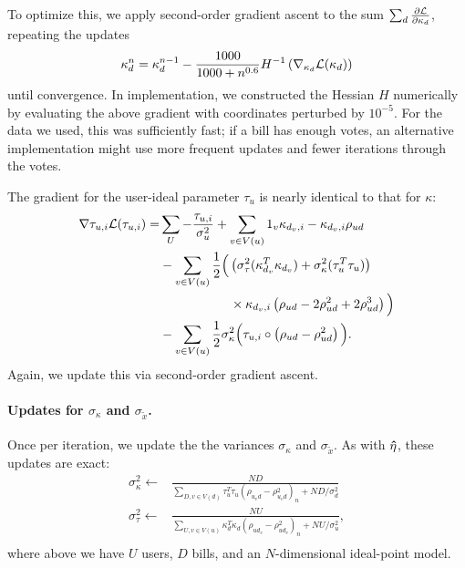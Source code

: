 To optimize this, we apply second-order gradient ascent to the sum
$\sum_d \frac{\partial \mathcal{L}}{\partial \kappa_d}$, repeating the updates 
\[\kappa_{d}^{n} = \kappa_{d}^{n-1} - \frac{1000}{1000 + n^{0.6}} H^{-1}\left( \nabla_{\kappa_{d}} \mathcal{L} (\kappa_{d}) \right) \]
until convergence.  In implementation, we constructed the Hessian $H$
numerically by evaluating the above gradient with coordinates
perturbed by $10^{-5}$.  For the data we used, this was sufficiently
fast; if a bill has enough votes, an alternative implementation
might use more frequent updates and fewer iterations through the
votes.

The gradient for the user-ideal parameter $\tau_u$ is nearly identical
to that for $\kappa$: 
 \begin{align}
 \label{eq:tau_update}
   \nabla{\tau_{u, i}} \mathcal{L} (\tau_{u, i}) =
 & \sum_{U} - \frac{\tau_{u, i}}{\sigma^2_u} 
  +  \sum_{v \in V(u)} 1_v \kappa_{d_v, i} - \kappa_{d_v, i} \rho_{ud} \nonumber \\
  & - \sum_{v \in V(u)} \frac{1}{2}
      \Big( \left( \sigma_\tau^2 (\kappa_{d_v}^T \kappa_{d_v}) + \sigma_\kappa^2 (\tau_u^T \tau_u) \right) \nonumber \\
  & \hspace{55pt} \times \kappa_{d_v, i} \left( \rho_{ud} - 2 \rho_{ud}^2 + 2 \rho_{ud}^3 \right) \Big) \nonumber \\
   & - \sum_{v \in V(u)} \frac{1}{2} \sigma_\kappa^2 \Big( \tau_{u,i} \circ
      \left( \rho_{ud}
      - \rho_{ud}^2 \right) \Big). \nonumber
 \end{align}
Again, we update this via second-order gradient ascent.

\paragraph{Updates for $\sigma_\kappa$ and $\sigma_{\tilde x}$.}
Once per iteration, we update the the variances $\sigma_\kappa$ and
$\sigma_{\tilde x}$.  As with $\bm \hat \eta$, these updates are exact:
\begin{align*}
  \sigma_\kappa^2 \gets & \frac{ND}{\sum_{D,v \in V(d)} \tau_u^T \tau_u (\rho_{u_vd} - \rho_{u_vd}^2  )_n + ND / \sigma_d^2 } \nonumber \\
  \sigma_\tau^2 \gets & \frac{NU}{\sum_{U,v \in V(u)} \kappa_d^T \kappa_d (\rho_{ud_v} - \rho_{ud_v}^2)_n + NU / \sigma_u^2 }, \nonumber \\
\end{align*}
where above we have $U$ users, $D$ bills, and an $N$-dimensional ideal-point
model.

